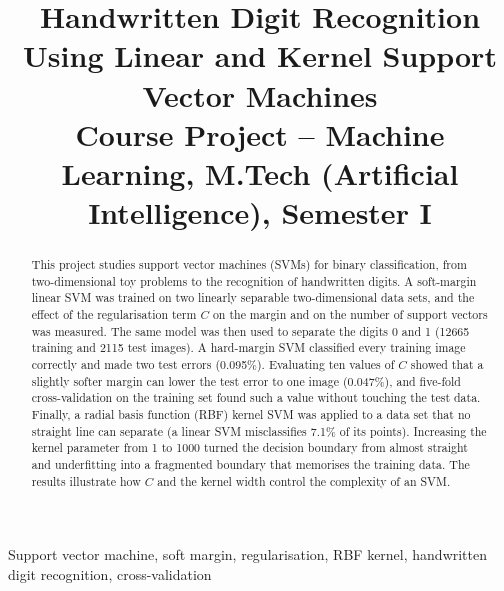 \documentclass[conference,a4paper]{IEEEtran}
\begin{document}
\title{Handwritten Digit Recognition Using Linear and Kernel Support Vector Machines\\
{\large Course Project -- Machine Learning, M.Tech (Artificial Intelligence), Semester I}}

\author{
}

\maketitle

\begin{abstract}
This project studies support vector machines (SVMs) for binary classification, from two-dimensional toy problems
to the recognition of handwritten digits. A soft-margin linear SVM was trained on two linearly separable
two-dimensional data sets, and the effect of the regularisation term $C$ on the margin and on the number of
support vectors was measured. The same model was then used to separate the digits 0 and 1 (12665 training and
2115 test images). A hard-margin SVM classified every training image correctly and made two test errors (0.095\%).
Evaluating ten values of $C$ showed that a slightly softer margin can lower the test error to one image (0.047\%),
and five-fold cross-validation on the training set found such a value without touching the test data. Finally,
a radial basis function (RBF) kernel SVM was applied to a data set that no straight line can separate (a linear SVM
misclassifies 7.1\% of its points). Increasing the kernel parameter from 1 to 1000 turned the decision boundary
from almost straight and underfitting into a fragmented boundary that memorises the training data. The results
illustrate how $C$ and the kernel width control the complexity of an SVM.
\end{abstract}

\begin{IEEEkeywords}
Support vector machine, soft margin, regularisation, RBF kernel, handwritten digit recognition, cross-validation
\end{IEEEkeywords}
\end{document}
